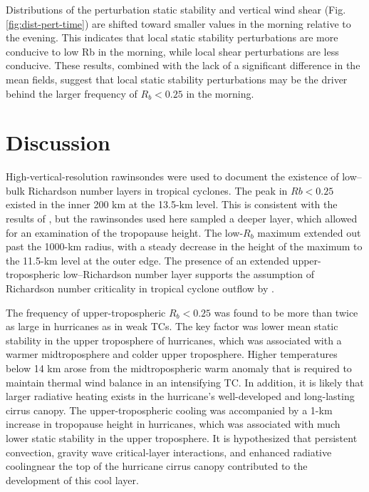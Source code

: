 Distributions of the perturbation static stability and vertical wind shear (Fig. \ref{fig:dist-pert-time}) are shifted toward smaller values in the morning relative to the evening.
This indicates that local static stability perturbations are more conducive to low Rb in the morning, while local shear perturbations are less conducive.
These results, combined with the lack of a significant difference in the mean fields, suggest that local static stability perturbations may be the driver behind the larger frequency of $R_b < 0.25$ in the morning.

\section{Discussion}
\label{sec:discussion}

High-vertical-resolution rawinsondes were used to document the existence of low–bulk Richardson number layers in tropical cyclones.
The peak in $Rb < 0.25$ existed in the inner 200 km at the 13.5-km level.
This is consistent with the results of \cite{Molinarietal2014}, but the rawinsondes used here sampled a deeper layer, which allowed for an examination of the tropopause height.
The low-$R_b$ maximum extended out past the 1000-km radius, with a steady decrease in the height of the maximum to the 11.5-km level at the outer edge.
The presence of an extended upper-tropospheric low--Richardson number layer supports the assumption of Richardson number criticality in tropical cyclone outflow by \cite{EmanuelRotunno2011}.

The frequency of upper-tropospheric $R_b < 0.25$ was found to be more than twice as large in hurricanes as in weak TCs.
The key factor was lower mean static stability in the upper troposphere of hurricanes, which was associated with a warmer midtroposphere and colder upper troposphere.
Higher temperatures below 14 km arose from the midtropospheric warm anomaly that is required to maintain thermal wind balance in an intensifying TC.
In addition, it is likely that larger radiative heating exists in the hurricane’s well-developed and long-lasting cirrus canopy.
The upper-tropospheric cooling was accompanied by a 1-km increase in tropopause height in hurricanes, which was associated with much lower static stability in the upper troposphere.
It is hypothesized that persistent convection, gravity wave critical-layer interactions, and enhanced radiative coolingnear the top of the hurricane cirrus canopy contributed to the development of this cool layer.


